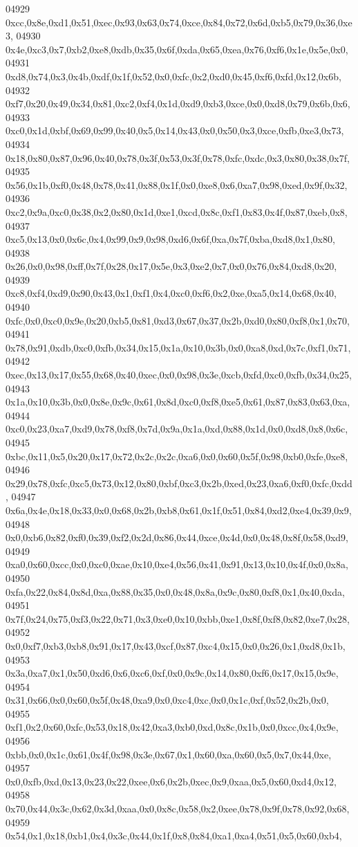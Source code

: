 \begin{DoxyCode}
04929   0xcc,0x8e,0xd1,0x51,0xec,0x93,0x63,0x74,0xce,0x84,0x72,0x6d,0xb5,0x79,0x36,0xe3,
04930   0x4e,0xc3,0x7,0xb2,0xe8,0xdb,0x35,0x6f,0xda,0x65,0xea,0x76,0xf6,0x1e,0x5e,0x0,
04931   0xd8,0x74,0x3,0x4b,0xdf,0x1f,0x52,0x0,0xfc,0x2,0xd0,0x45,0xf6,0xfd,0x12,0x6b,
04932   0xf7,0x20,0x49,0x34,0x81,0xc2,0xf4,0x1d,0xd9,0xb3,0xce,0x0,0xd8,0x79,0x6b,0x6,
04933   0xc0,0x1d,0xbf,0x69,0x99,0x40,0x5,0x14,0x43,0x0,0x50,0x3,0xce,0xfb,0xe3,0x73,
04934   0x18,0x80,0x87,0x96,0x40,0x78,0x3f,0x53,0x3f,0x78,0xfc,0xdc,0x3,0x80,0x38,0x7f,
04935   0x56,0x1b,0xf0,0x48,0x78,0x41,0x88,0x1f,0x0,0xe8,0x6,0xa7,0x98,0xed,0x9f,0x32,
04936   0xc2,0x9a,0xc0,0x38,0x2,0x80,0x1d,0xe1,0xcd,0x8c,0xf1,0x83,0x4f,0x87,0xeb,0x8,
04937   0xc5,0x13,0x0,0x6c,0x4,0x99,0x9,0x98,0xd6,0x6f,0xa,0x7f,0xba,0xd8,0x1,0x80,
04938   0x26,0x0,0x98,0xff,0x7f,0x28,0x17,0x5e,0x3,0xe2,0x7,0x0,0x76,0x84,0xd8,0x20,
04939   0xc8,0xf4,0xd9,0x90,0x43,0x1,0xf1,0x4,0xc0,0xf6,0x2,0xe,0xa5,0x14,0x68,0x40,
04940   0xfc,0x0,0xc0,0x9e,0x20,0xb5,0x81,0xd3,0x67,0x37,0x2b,0xd0,0x80,0xf8,0x1,0x70,
04941   0x78,0x91,0xdb,0xc0,0xfb,0x34,0x15,0x1a,0x10,0x3b,0x0,0xa8,0xd,0x7c,0xf1,0x71,
04942   0xec,0x13,0x17,0x55,0x68,0x40,0xec,0x0,0x98,0x3e,0xcb,0xfd,0xc0,0xfb,0x34,0x25,
04943   0x1a,0x10,0x3b,0x0,0x8e,0x9c,0x61,0x8d,0xc0,0xf8,0xe5,0x61,0x87,0x83,0x63,0xa,
04944   0xc0,0x23,0xa7,0xd9,0x78,0xf8,0x7d,0x9a,0x1a,0xd,0x88,0x1d,0x0,0xd8,0x8,0x6c,
04945   0xbc,0x11,0x5,0x20,0x17,0x72,0x2c,0x2c,0xa6,0x0,0x60,0x5f,0x98,0xb0,0xfe,0xe8,
04946   0x29,0x78,0xfc,0xc5,0x73,0x12,0x80,0xbf,0xc3,0x2b,0xed,0x23,0xa6,0xf0,0xfc,0xdd,
04947   0x6a,0x4e,0x18,0x33,0x0,0x68,0x2b,0xb8,0x61,0x1f,0x51,0x84,0xd2,0xe4,0x39,0x9,
04948   0x0,0xb6,0x82,0xf0,0x39,0xf2,0x2d,0x86,0x44,0xce,0x4d,0x0,0x48,0x8f,0x58,0xd9,
04949   0xa0,0x60,0xcc,0x0,0xc0,0xae,0x10,0xe4,0x56,0x41,0x91,0x13,0x10,0x4f,0x0,0x8a,
04950   0xfa,0x22,0x84,0x8d,0xa,0x88,0x35,0x0,0x48,0x8a,0x9c,0x80,0xf8,0x1,0x40,0xda,
04951   0x7f,0x24,0x75,0xf3,0x22,0x71,0x3,0xe0,0x10,0xbb,0xe1,0x8f,0xf8,0x82,0xe7,0x28,
04952   0x0,0xf7,0xb3,0xb8,0x91,0x17,0x43,0xcf,0x87,0xc4,0x15,0x0,0x26,0x1,0xd8,0x1b,
04953   0x3a,0xa7,0x1,0x50,0xd6,0x6,0xc6,0xf,0x0,0x9c,0x14,0x80,0xf6,0x17,0x15,0x9e,
04954   0x31,0x66,0x0,0x60,0x5f,0x48,0xa9,0x0,0xc4,0xc,0x0,0x1c,0xf,0x52,0x2b,0x0,
04955   0xf1,0x2,0x60,0xfc,0x53,0x18,0x42,0xa3,0xb0,0xd,0x8c,0x1b,0x0,0xcc,0x4,0x9e,
04956   0xbb,0x0,0x1c,0x61,0x4f,0x98,0x3e,0x67,0x1,0x60,0xa,0x60,0x5,0x7,0x44,0xe,
04957   0x0,0xfb,0xd,0x13,0x23,0x22,0xee,0x6,0x2b,0xec,0x9,0xaa,0x5,0x60,0xd4,0x12,
04958   0x70,0x44,0x3c,0x62,0x3d,0xaa,0x0,0x8c,0x58,0x2,0xee,0x78,0x9f,0x78,0x92,0x68,
04959   0x54,0x1,0x18,0xb1,0x4,0x3c,0x44,0x1f,0x8,0x84,0xa1,0xa4,0x51,0x5,0x60,0xb4,

\end{DoxyCode}
